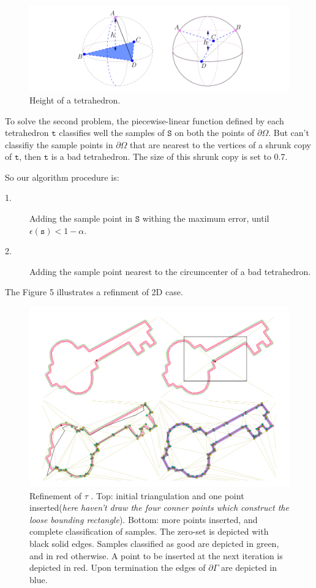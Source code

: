 \documentclass{article}
\theoremstyle{definition}
\theoremstyle{remark}
\begin{document}
\begin{figure}[H]
 	\includegraphics[width=12cm]{4}
	\caption[Height]
        {Height of a tetrahedron.}
 	\centering
\end{figure}
\par To solve the second problem, the piecewise-linear function defined by each tetrahedron $\mathtt{t}$ classifies well the samples of  $\mathtt{S}$ on both the points of $\partial \Omega$. But can't classifiy the sample points in $\partial \Omega$ that are nearest to the vertices of a shrunk copy of $\mathtt{t}$, then $\mathtt{t}$ is a bad tetrahedron. The size of this shrunk copy is set to 0.7.
\par So our algorithm procedure is:
\begin{description}
 \item[1.] Adding the sample point in  $\mathtt{S}$ withing the maximum error, until $\epsilon(\mathtt{s}) < 1- \alpha$.
 \item[2.] Adding the sample point nearest to the circumcenter of a bad tetrahedron.
\end{description}
The Figure 5 illustrates a refinment of 2D case.
\begin{figure}[H]
 	\includegraphics[width=12cm]{5}
	\caption[Refinment of 2D case]
        {Refinement of $\tau$ . Top: initial triangulation and one point inserted(\emph{here haven't draw the four conner points which construct the loose bounding rectangle}). Bottom: more points inserted, and
complete classification of samples. The zero-set is depicted with black solid edges. Samples classified as good are depicted in green, and in red otherwise. A point to be inserted at the next iteration is depicted in red. Upon termination the edges of $\partial \Gamma$ are depicted in blue.}
 	\centering
\end{figure}
\end{document}
